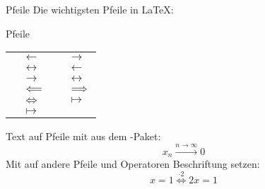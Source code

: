 \begin{frame}[fragile]{Pfeile}
Die wichtigsten Pfeile in \LaTeX{}:
\begin{block}{Pfeile}
\centering
\scriptsize
\begin{tabular}{*{2}{|rl}|}\hline
		 & $\leftarrow$ & 
		 & $\rightarrow$ \\
		 & $\leftrightarrow$ &
		 & $\longleftarrow$ \\
		 & $\longrightarrow$ &
		 & $\longleftrightarrow$ \\
		 & $\impliedby$ & 
		 & $\implies$ \\
		 & $\iff$ &
		 & $\mapsto$ \\
		 & $\longmapsto$ & 
		& \\ \hline
\end{tabular}
\end{block}\pause
Text auf Pfeile mit  aus dem -Paket:
\[
    x_n\xrightarrow{n\rightarrow\infty}0
\]
Mit  auf andere Pfeile und Operatoren Beschriftung setzen: 
\[
    x=1 \overset{\cdot2}{\iff} 2x=1
\]
\end{frame}